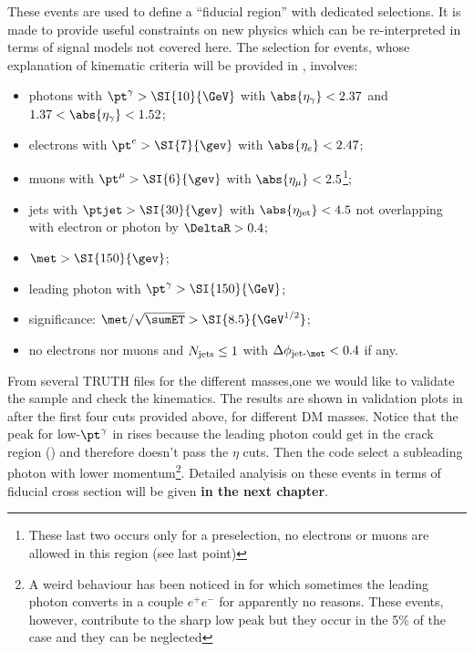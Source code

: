 These events are used to define a ``fiducial region'' with dedicated selections. It is made to provide useful constraints on new physics which can be re-interpreted in terms of signal models not covered here. The selection for \mph events, whose explanation of kinematic criteria will be provided in \Sect{\ref{sec:SRselection}}, involves:
\begin{itemize}
\item photons with $\pt^\gamma>\SI{10}{\GeV}$ with $\abs{\eta_\gamma}<2.37$ and $1.37<\abs{\eta_\gamma}<1.52$;
\item electrons with $\pt^e>\SI{7}{\gev}$ with $\abs{\eta_e}<2.47$;
\item muons with $\pt^\mu>\SI{6}{\gev}$ with $\abs{\eta_\mu}<2.5$\footnote{These last two occurs only for a preselection, no electrons or muons are allowed in this region (see last point)};
\item jets with $\ptjet>\SI{30}{\gev}$ with $\abs{\eta_{\textup{jet}}}<4.5$ not overlapping with electron or photon by $\DeltaR > 0.4$;
\item $\met>\SI{150}{\gev}$;
\item leading photon with $\pt^\gamma > \SI{150}{\GeV}$;
\item \met significance: $\met/\sqrt{\sumET} > \SI{8.5}{\GeV^{1/2}}$;
\item no electrons nor muons and $N_\textup{jets}\le 1$ with $\Delta\phi_\textup{jet-\met}<0.4$ if any.
\end{itemize}


From several TRUTH files for the different masses,one we would like to validate the sample and check the kinematics. The results are shown in validation plots in \Fig{\ref{fig:validation}} after the first four cuts provided above, for different DM masses. Notice that the peak for low-$\pt^\gamma$ in \Fig{\ref{subfig:phpt}} rises because the leading photon could get in the crack region () and therefore doesn't pass the $\eta$ cuts. Then the code select a subleading photon with lower momentum\footnote{A weird behaviour has been noticed in \PYTHIA for which sometimes the leading photon converts in a couple $e^+e^-$ for apparently no reasons. These events, however, contribute to the sharp low peak but they occur in the 5\% of the case and they can be neglected}. Detailed analyisis on these events in terms of fiducial cross section will be given {\bfseries in the next chapter}.

